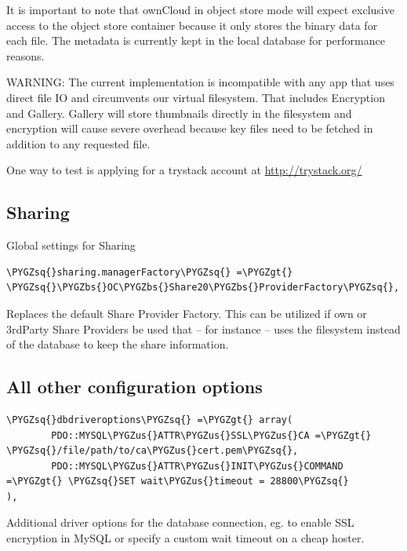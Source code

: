 \documentclass[letterpaper,10pt,english]{sphinxmanual}
\def\PYGZbs{\char`\\}
\def\PYGZus{\char`\_}
\def\PYGZgt{\char`\>}
\def\PYGZsq{\char`\'}
\begin{document}
It is important to note that ownCloud in object store mode will expect
exclusive access to the object store container because it only stores the
binary data for each file. The metadata is currently kept in the local
database for performance reasons.

WARNING: The current implementation is incompatible with any app that uses
direct file IO and circumvents our virtual filesystem. That includes
Encryption and Gallery. Gallery will store thumbnails directly in the
filesystem and encryption will cause severe overhead because key files need
to be fetched in addition to any requested file.

One way to test is applying for a trystack account at \href{http://trystack.org/}{http://trystack.org/}


\subsection{Sharing}
\label{configuration_server/config_sample_php_parameters:sharing}
Global settings for Sharing

\begin{Verbatim}[commandchars=\\\{\}]
\PYGZsq{}sharing.managerFactory\PYGZsq{} =\PYGZgt{} \PYGZsq{}\PYGZbs{}OC\PYGZbs{}Share20\PYGZbs{}ProviderFactory\PYGZsq{},
\end{Verbatim}

Replaces the default Share Provider Factory. This can be utilized if
own or 3rdParty Share Providers be used that – for instance – uses the
filesystem instead of the database to keep the share information.


\subsection{All other configuration options}
\label{configuration_server/config_sample_php_parameters:all-other-configuration-options}
\begin{Verbatim}[commandchars=\\\{\}]
\PYGZsq{}dbdriveroptions\PYGZsq{} =\PYGZgt{} array(
        PDO::MYSQL\PYGZus{}ATTR\PYGZus{}SSL\PYGZus{}CA =\PYGZgt{} \PYGZsq{}/file/path/to/ca\PYGZus{}cert.pem\PYGZsq{},
        PDO::MYSQL\PYGZus{}ATTR\PYGZus{}INIT\PYGZus{}COMMAND =\PYGZgt{} \PYGZsq{}SET wait\PYGZus{}timeout = 28800\PYGZsq{}
),
\end{Verbatim}

Additional driver options for the database connection, eg. to enable SSL
encryption in MySQL or specify a custom wait timeout on a cheap hoster.
\end{document}
